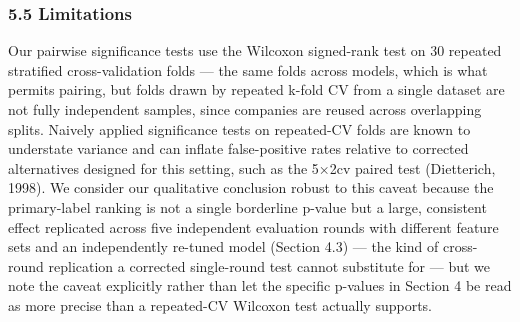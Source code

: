 \documentclass[11pt,]{article}
\begin{document}
\hypertarget{limitations}{%
\subsubsection{5.5 Limitations}\label{limitations}}

Our pairwise significance tests use the Wilcoxon signed-rank test on 30
repeated stratified cross-validation folds --- the same folds across
models, which is what permits pairing, but folds drawn by repeated
k-fold CV from a single dataset are not fully independent samples, since
companies are reused across overlapping splits. Naively applied
significance tests on repeated-CV folds are known to understate variance
and can inflate false-positive rates relative to corrected alternatives
designed for this setting, such as the 5×2cv paired test (Dietterich,
1998). We consider our qualitative conclusion robust to this caveat
because the primary-label ranking is not a single borderline p-value but
a large, consistent effect replicated across five independent evaluation
rounds with different feature sets and an independently re-tuned model
(Section 4.3) --- the kind of cross-round replication a corrected
single-round test cannot substitute for --- but we note the caveat
explicitly rather than let the specific p-values in Section 4 be read as
more precise than a repeated-CV Wilcoxon test actually supports.
\end{document}
